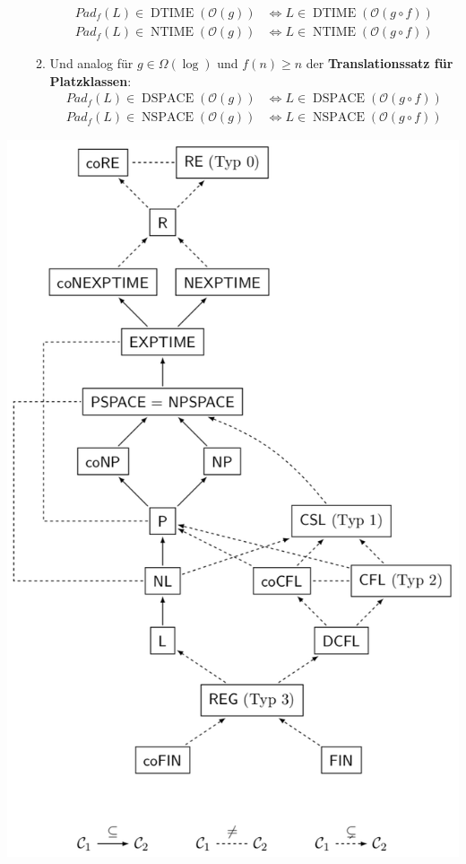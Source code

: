 \documentclass[landscape, 8pt, a4paper]{extarticle}
\begin{document}
\begin{multicols}{3}
\begin{itemize}
\begin{enumerate}
			\begin{align*}
				Pad_f(L)\in \operatorname{DTIME}(\mathcal O(g))&\Leftrightarrow L\in \operatorname{DTIME}(\mathcal O(g\circ f))\\
				Pad_f(L)\in \operatorname{NTIME}(\mathcal O(g))&\Leftrightarrow L\in \operatorname{NTIME}(\mathcal O(g\circ f))
			\end{align*}
			\item Und analog für $g\in\Omega(\log)$ und $f(n)\geq n$ der \textbf{Translationssatz für Platzklassen}:
			\begin{align*}
				Pad_f(L)\in \operatorname{DSPACE}(\mathcal O(g))&\Leftrightarrow L\in \operatorname{DSPACE}(\mathcal O(g\circ f))\\
				Pad_f(L)\in \operatorname{NSPACE}(\mathcal O(g))&\Leftrightarrow L\in \operatorname{NSPACE}(\mathcal O(g\circ f))
			\end{align*}
		\end{enumerate}
	\end{itemize}

	\includegraphics[width=\columnwidth]{graph.png}


\end{multicols}
\end{document}
